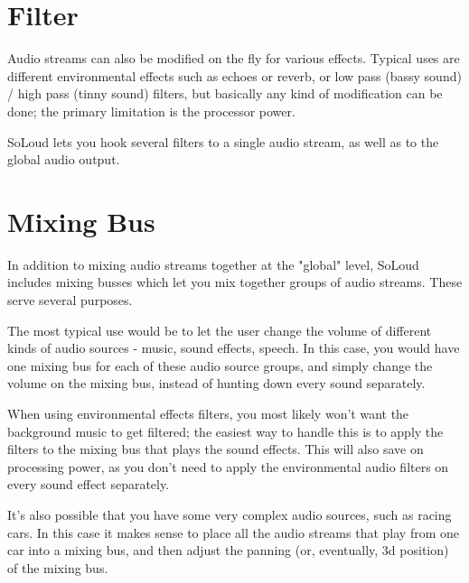 \section{Filter}

Audio streams can also be modified on the fly for various effects. Typical uses are different environmental effects such as echoes or reverb, or low pass (bassy sound) / high pass (tinny sound) filters, but basically any kind of modification can be done; the primary limitation is the processor power.

SoLoud lets you hook several filters to a single audio stream, as well as to the global audio output.

\section{Mixing Bus}

In addition to mixing audio streams together at the "global" level, SoLoud includes mixing busses which let you mix together groups of audio streams. These serve several purposes.

The most typical use would be to let the user change the volume of different kinds of audio sources - music, sound effects, speech. In this case, you would have one mixing bus for each of these audio source groups, and simply change the volume on the mixing bus, instead of hunting down every sound separately.

When using environmental effects filters, you most likely won't want the background music to get filtered; the easiest way to handle this is to apply the filters to the mixing bus that plays the sound effects. This will also save on processing power, as you don't need to apply the environmental audio filters on every sound effect separately.

It's also possible that you have some very complex audio sources, such as racing cars. In this case it makes sense to place all the audio streams that play from one car into a mixing bus, and then adjust the panning (or, eventually, 3d position) of the mixing bus.